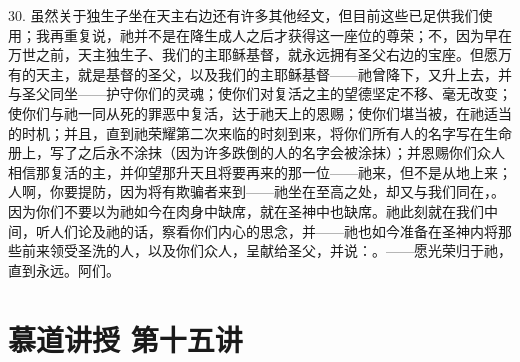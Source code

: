 30. 虽然关于独生子坐在天主右边还有许多其他经文，但目前这些已足供我们使用；我再重复说，祂并不是在降生成人之后才获得这一座位的尊荣；不，因为早在万世之前，天主独生子、我们的主耶稣基督，就永远拥有圣父右边的宝座。但愿万有的天主，就是基督的圣父，以及我们的主耶稣基督——祂曾降下，又升上去，并与圣父同坐——护守你们的灵魂；使你们对复活之主的望德坚定不移、毫无改变；使你们与祂一同从死的罪恶中复活，达于祂天上的恩赐；使你们堪当被，在祂适当的时机；并且，直到祂荣耀第二次来临的时刻到来，将你们所有人的名字写在生命册上，写了之后永不涂抹（因为许多跌倒的人的名字会被涂抹）；并恩赐你们众人相信那复活的主，并仰望那升天且将要再来的那一位——祂来，但不是从地上来；人啊，你要提防，因为将有欺骗者来到——祂坐在至高之处，却又与我们同在，。因为你们不要以为祂如今在肉身中缺席，就在圣神中也缺席。祂此刻就在我们中间，听人们论及祂的话，察看你们内心的思念，并——祂也如今准备在圣神内将那些前来领受圣洗的人，以及你们众人，呈献给圣父，并说：。——愿光荣归于祂，直到永远。阿们。\par



\section{慕道讲授 第十五讲}

\par

\par

\par

